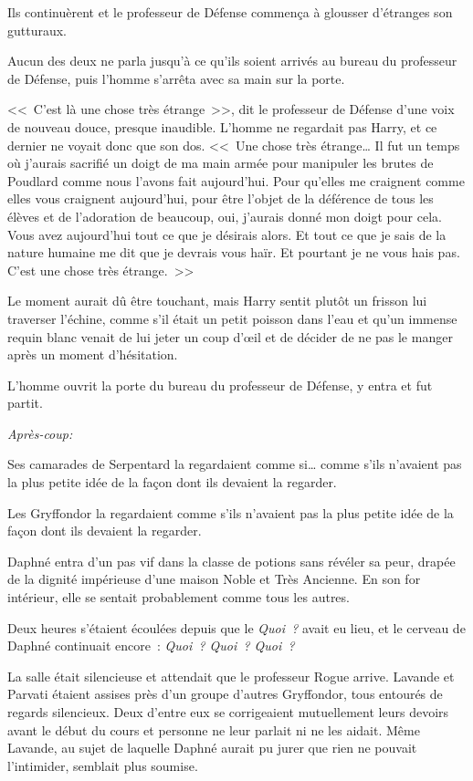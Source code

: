 Ils continuèrent et le professeur de Défense commença à glousser d'étranges son gutturaux.

Aucun des deux ne parla jusqu'à ce qu'ils soient arrivés au bureau du professeur de Défense, puis l'homme s'arrêta avec sa main sur la porte.

<<~C'est là une chose très étrange~>>, dit le professeur de Défense d'une voix de nouveau douce, presque inaudible. L'homme ne regardait pas Harry, et ce dernier ne voyait donc que son dos. <<~Une chose très étrange… Il fut un temps où j'aurais sacrifié un doigt de ma main armée pour manipuler les brutes de Poudlard comme nous l'avons fait aujourd'hui. Pour qu'elles me craignent comme elles vous craignent aujourd'hui, pour être l'objet de la déférence de tous les élèves et de l'adoration de beaucoup, oui, j'aurais donné mon doigt pour cela. Vous avez aujourd'hui tout ce que je désirais alors. Et tout ce que je sais de la nature humaine me dit que je devrais vous haïr. Et pourtant je ne vous hais pas. C'est une chose très étrange.~>>

Le moment aurait dû être touchant, mais Harry sentit plutôt un frisson lui traverser l'échine, comme s'il était un petit poisson dans l'eau et qu'un immense requin blanc venait de lui jeter un coup d'œil et de décider de ne pas le manger après un moment d'hésitation.

L'homme ouvrit la porte du bureau du professeur de Défense, y entra et fut partit.

\later

\emph{Après-coup:}

Ses camarades de Serpentard la regardaient comme si… comme s'ils n'avaient pas la plus petite idée de la façon dont ils devaient la regarder.

Les Gryffondor la regardaient comme s'ils n'avaient pas la plus petite idée de la façon dont ils devaient la regarder.

Daphné entra d'un pas vif dans la classe de potions sans révéler sa peur, drapée de la dignité impérieuse d'une maison Noble et Très Ancienne. En son for intérieur, elle se sentait probablement comme tous les autres.

Deux heures s'étaient écoulées depuis que le \emph{Quoi~?} avait eu lieu, et le cerveau de Daphné continuait encore~: \emph{Quoi~? Quoi~? Quoi~?}

La salle était silencieuse et attendait que le professeur Rogue arrive. Lavande et Parvati étaient assises près d'un groupe d'autres Gryffondor, tous entourés de regards silencieux. Deux d'entre eux se corrigeaient mutuellement leurs devoirs avant le début du cours et personne ne leur parlait ni ne les aidait. Même Lavande, au sujet de laquelle Daphné aurait pu jurer que rien ne pouvait l'intimider, semblait plus soumise.

